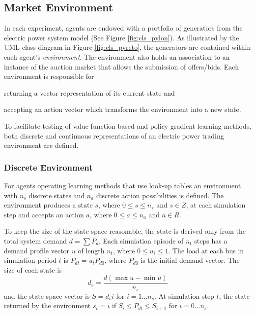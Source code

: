 \subsection{Market Environment}
In each experiment, agents are endowed with a portfolio of generators from the
electric power system model (See Figure \ref{fig:cls_pylon}).  As
illustrated by the UML class diagram in Figure \ref{fig:cls_pyreto},
the generators are contained within each agent's \textit{environment}.  The
environment also holds an association to an instance of the auction market
that allows the submission of offers/bids. Each environment is responsible for \begin{inparaenum}[(i)]
\item returning a vector representation of its current state and \item
accepting an action vector which transforms the environment into a new state.
\end{inparaenum}  To facilitate testing of value function based and policy
gradient learning methods, both discrete and continuous representations of an
electric power trading environment are defined.


\subsubsection{Discrete Environment}
For agents operating learning methods that use look-up tables an environment
with $n_s$ discrete states and $n_a$ discrete action possibilities is defined.
The environment produces a state $s$, where $0\leq s \leq n_s$ and $s \in Z$,
at each simulation step and accepts an action $a$, where $0\leq a \leq n_a$
and $a \in R$.

To keep the size of the state space reasonable, the state is derived only
from the total system demand $d=\sum P_d$.  Each simulation episode of $n_t$
steps has a demand profile vector $u$ of length $n_t$, where $0 \leq u_i \leq 1$.
The load at each bus in simulation period $t$ is $P_{dt} = u_tP_{d0}$, where
$P_{d0}$ is the initial demand vector.  The size of each state is
\begin{equation}
d_s = \frac{d(\max u - \min u)}{n_s}
\end{equation}
and the state space vector is $S=d_si$ for $i=1\dotsc n_s$.  At simulation step
$t$, the state returned by the environment $s_t = i$ if $S_i \leq P_{dt} \leq
S_{i+1}$ for $i = 0\dotsc n_s$.

